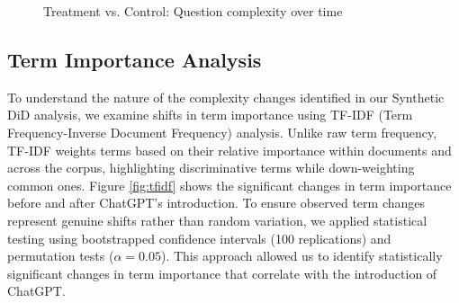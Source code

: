 \begin{figure}[H]
    \centering
    
    \caption{Treatment vs. Control: Question complexity over time}
    \label{fig:complex}
\end{figure}


\subsection{Term Importance Analysis}
To understand the nature of the complexity changes identified in our Synthetic DiD analysis, we examine shifts in term importance using TF-IDF (Term Frequency-Inverse Document Frequency) analysis. Unlike raw term frequency, TF-IDF weights terms based on their relative importance within documents and across the corpus, highlighting discriminative terms while down-weighting common ones. Figure \ref{fig:tfidf} shows the significant changes in term importance before and after ChatGPT's introduction. To ensure observed term changes represent genuine shifts rather than random variation, we applied statistical testing using bootstrapped confidence intervals (100 replications) and permutation tests ($\alpha = 0.05$). This approach allowed us to identify statistically significant changes in term importance that correlate with the introduction of ChatGPT.
